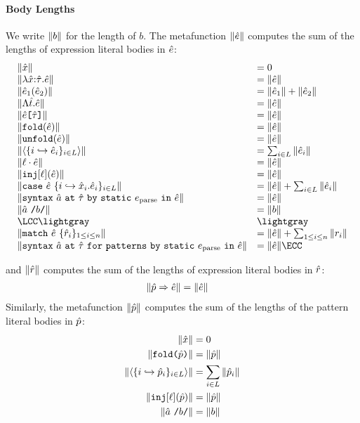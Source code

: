 \paragraph{Body Lengths}\label{appendix:SES-body-lengths}
We write $\Vert b \Vert$ for the length of $b$. The metafunction $\Vert {\hat e} \Vert$ computes the sum of the lengths of expression literal bodies in ${\hat e}$:
\[
\begin{array}{ll}
\sizeof{\ux} & = 0\\
\sizeof{\lam{\ux}{\utau}{\ue}} &= \sizeof{\ue}\\
\sizeof{\ap{\ue_1}{\ue_2}} & = \sizeof{\ue_1} + \sizeof{\ue_2}\\
\sizeof{\Lam{\ut}{\ue}} & = \sizeof{\ue}\\
\sizeof{\App{\ue}{\utau}} & = \sizeof{\ue}\\
\sizeof{\fold{\ue}} & = \sizeof{\ue}\\
\sizeof{\unfold{\ue}} & = \sizeof{\ue}\\
\sizeof{\tpl{\mapschema{\ue}{i}{\labelset}}} & = \sum_{i \in \labelset} \sizeof{\ue_i}\\
\sizeof{\prj{\ell}{\ue}} & = \sizeof{\ue}\\
\sizeof{\inj{\ell}{\ue}} & = \sizeof{\ue}\\
\sizeof{\caseof{\ue}{\mapschemab{\ux}{\ue}{i}{\labelset}}} & = \sizeof{\ue} + \sum_{i \in \labelset} \sizeof{\ue_i}\\
\sizeof{\uesyntax{\tsmv}{\utau}{\eparse}{\ue}} & = \sizeof{\ue}\\
\sizeof{\utsmap{\tsmv}{b}} & = \sizeof{b}\\
\LCC \lightgray & \lightgray\\
\sizeof{\matchwith{\ue}{\seqschemaX{\urv}}} & = \sizeof{\ue} + \sum_{1 \leq i \leq n} \sizeof{r_i}\\
\sizeof{\usyntaxup{\tsmv}{\utau}{\eparse}{\ue}} & = \sizeof{\ue}\ECC
\end{array}
\]
\vspace{-3px}\begin{grayparbox}\vspace{3px}and $\Vert \hat{r} \Vert$ computes the sum of the lengths of expression literal bodies in $\hat{r}$:
\begin{align*}
\Vert \hat{p} \Rightarrow {\hat e} \Vert & = \Vert {\hat e} \Vert
\end{align*}
Similarly, the metafunction $\Vert \hat{p} \Vert$ computes the sum of the lengths of the pattern literal bodies in $\hat{p}$:
\begin{align*}
\Vert {\hat x} \Vert & = 0\\
\Vert \texttt{fold}\texttt{(}\hat{p}\texttt{)} \Vert & = \Vert \hat{p} \Vert\\
\Vert \langle \{i \hookrightarrow \hat{p}_{i}\}_{i \in L} \rangle \Vert & = \sum_{i \in L} \Vert \hat{p}_i \Vert\\
\Vert \texttt{inj}[\ell](\hat{p}) \Vert & = \Vert \hat{p} \Vert\\
\Vert \hat{a}~\texttt{/}b\texttt{/} \Vert & = \Vert b \Vert
\end{align*}
\end{grayparbox}

